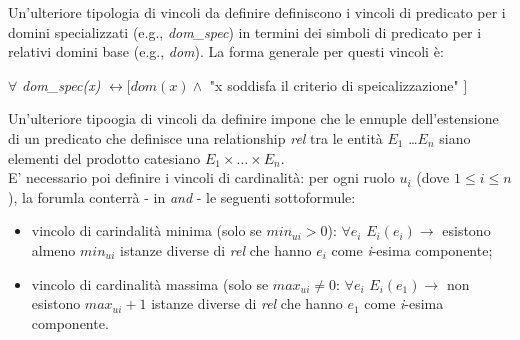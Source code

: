 Un'ulteriore tipologia di vincoli da definire definiscono i vincoli di predicato per i domini specializzati (e.g., \textit{dom\_spec}) in termini dei simboli di predicato per i relativi domini base (e.g., \textit{dom}). La forma generale per questi vincoli è:
\begin{center}
	$\forall$ \textit{dom\_spec(x)} $\leftrightarrow [dom(x) \wedge $ "x soddisfa il criterio di speicalizzazione" $]$
\end{center}
Un'ulteriore tipoogia di vincoli da definire impone che le ennuple dell'estensione di un predicato che definisce una relationship \textit{rel} tra le entità $E_1$ \ldots $E_n$ siano elementi del prodotto catesiano $E_1 \times \ldots \times E_n$. \\
E' necessario poi definire i vincoli di cardinalità: per ogni ruolo $u_i$ (dove $1 \leq i \leq n$), la forumla conterrà - in \textit{and} - le seguenti sottoformule:
\begin{itemize}
	\item vincolo di carindalità minima (solo se $min_{ui} > 0$): $\forall e_i$ $E_i(e_i) \rightarrow $ esistono almeno $min_{ui}$ istanze diverse di \textit{rel} che hanno $e_i$ come \textit{i}-esima componente;
	\item vincolo di cardinalità massima (solo se $max_{ui} \neq 0$: $\forall e_i$ $E_i(e_1) \rightarrow $ non esistono $max_{ui}+1$ istanze diverse di \textit{rel} che hanno $e_1$ come \textit{i}-esima componente.
\end{itemize}

